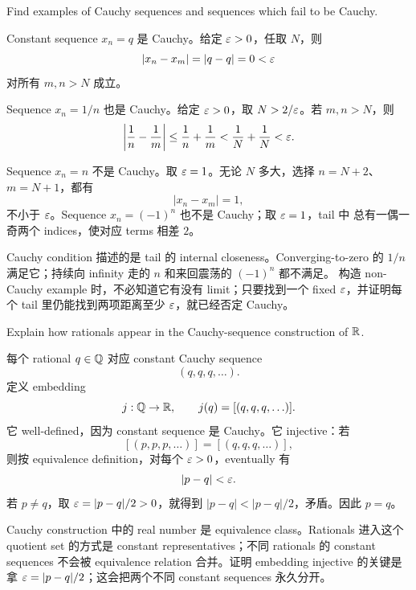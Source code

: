 \begin{exerciseblock}
Find examples of Cauchy sequences and sequences which fail to be Cauchy.
\end{exerciseblock}

\begin{solution}
Constant sequence \(x_n=q\) 是 Cauchy。给定 \(\varepsilon>0\)，任取 \(N\)，则
\[
  |x_n-x_m|=|q-q|=0<\varepsilon
\]
对所有 \(m,n>N\) 成立。

Sequence \(x_n=1/n\) 也是 Cauchy。给定 \(\varepsilon>0\)，取 \(N>2/\varepsilon\)。若
\(m,n>N\)，则
\[
  \left|\frac1n-\frac1m\right|
  \leq \frac1n+\frac1m
  <\frac1N+\frac1N
  <\varepsilon.
\]

Sequence \(x_n=n\) 不是 Cauchy。取 \(\varepsilon=1\)。无论 \(N\) 多大，选择
\(n=N+2\)、\(m=N+1\)，都有
\[
  |x_n-x_m|=1,
\]
不小于 \(\varepsilon\)。Sequence \(x_n=(-1)^n\) 也不是 Cauchy；取 \(\varepsilon=1\)，tail 中
总有一偶一奇两个 indices，使对应 terms 相差 \(2\)。
\end{solution}

\begin{explanation}
Cauchy condition 描述的是 tail 的 internal closeness。Converging-to-zero 的
\(1/n\) 满足它；持续向 infinity 走的 \(n\) 和来回震荡的 \((-1)^n\) 都不满足。
构造 non-Cauchy example 时，不必知道它有没有 limit；只要找到一个 fixed
\(\varepsilon\)，并证明每个 tail 里仍能找到两项距离至少 \(\varepsilon\)，就已经否定 Cauchy。
\end{explanation}

\begin{exerciseblock}
Explain how rationals appear in the Cauchy-sequence construction of \(\mathbb{R}\).
\end{exerciseblock}

\begin{solution}
每个 rational \(q\in\mathbb{Q}\) 对应 constant Cauchy sequence
\[
  (q,q,q,\ldots).
\]
定义 embedding
\[
  j:\mathbb{Q}\to\mathbb{R},\qquad j(q)=[(q,q,q,\ldots)].
\]
它 well-defined，因为 constant sequence 是 Cauchy。它 injective：若
\[
  [(p,p,p,\ldots)]=[(q,q,q,\ldots)],
\]
则按 equivalence definition，对每个 \(\varepsilon>0\)，eventually 有
\[
  |p-q|<\varepsilon.
\]
若 \(p\ne q\)，取 \(\varepsilon=|p-q|/2>0\)，就得到 \(|p-q|<|p-q|/2\)，矛盾。因此
\(p=q\)。
\end{solution}

\begin{explanation}
Cauchy construction 中的 real number 是 equivalence class。Rationals 进入这个
quotient set 的方式是 constant representatives；不同 rationals 的 constant
sequences 不会被 equivalence relation 合并。证明 embedding injective 的关键是
拿 \(\varepsilon=|p-q|/2\)；这会把两个不同 constant sequences 永久分开。
\end{explanation}

